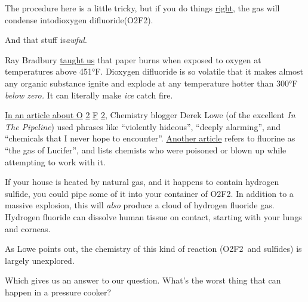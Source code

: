 {The procedure here is a little tricky, but if you do things \href{http://www.sciencedirect.com/science/article/pii/S0022113900803413}{right}, the gas will condense intodioxygen difluoride(O2F2).}

{And that stuff is\emph{awful}.}

{Ray Bradbury \href{http://en.wikipedia.org/wiki/Fahrenheit\_451}{taught us} that paper burns when exposed to oxygen at temperatures above 451°F. Dioxygen difluoride is so volatile that it makes almost any organic substance ignite and explode at any temperature hotter than 300°F \emph{below zero.} It can literally make \emph{ice} catch fire.}

{ \href{http://pipeline.corante.com/archives/2010/02/23/things\_i\_wont\_work\_with\_dioxygen\_difluoride.php}{In an article about O} \href{http://pipeline.corante.com/archives/2010/02/23/things\_i\_wont\_work\_with\_dioxygen\_difluoride.php}{2} \href{http://pipeline.corante.com/archives/2010/02/23/things\_i\_wont\_work\_with\_dioxygen\_difluoride.php}{F} \href{http://pipeline.corante.com/archives/2010/02/23/things\_i\_wont\_work\_with\_dioxygen\_difluoride.php}{2}, Chemistry blogger Derek Lowe (of the excellent \emph{In The Pipeline}) used phrases like “violently hideous”, “deeply alarming”, and “chemicals that I never hope to encounter”. \href{http://www.lateralscience.co.uk/Fluorine/Fluorine.html}{Another article} refers to fluorine as “the gas of Lucifer”, and lists chemists who were poisoned or blown up while attempting to work with it.}

{If your house is heated by natural gas, and it happens to contain hydrogen sulfide, you could pipe some of it into your container of O2F2. In addition to a massive explosion, this will \emph{also} produce a cloud of hydrogen fluoride gas. Hydrogen fluoride can dissolve human tissue on contact, starting with your lungs and corneas.}

{As Lowe points out, the chemistry of this kind of reaction (O2F2 and sulfides) is largely unexplored.}

{Which gives us an answer to our question. What’s the worst thing that can happen in a pressure cooker?}

